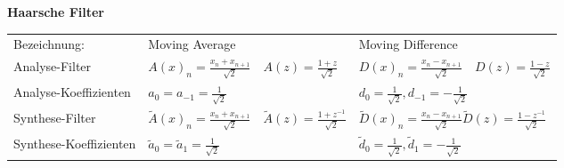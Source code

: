 \textbf{Haarsche Filter }\\
  \begin{tabularx}{\textwidth}{l |l |X}
    Bezeichnung:
      & Moving Average
      & Moving Difference \\
    Analyse-Filter
      & $A(x)_n = \frac{x_n + x_{n+1}}{\sqrt{2}} \quad
         A(z) = \frac{1+z}{\sqrt{2}}$
      & $D(x)_n = \frac{x_n - x_{n+1}}{\sqrt{2}} \quad
         D(z) = \frac{1-z}{\sqrt{2}}$ \\
    Analyse-Koeffizienten
      & $a_0 = a_{-1} = \frac{1}{\sqrt{2}}$
      & $d_0 = \frac{1}{\sqrt{2}}, d_{-1} = -\frac{1}{\sqrt{2}}$ \\
    Synthese-Filter
      & $\tilde{A}(x)_n = \frac{x_n + x_{n+1}}{\sqrt{2}} \quad
         \tilde{A}(z) = \frac{1+z^{-1}}{\sqrt{2}}$
      & $\tilde{D}(x)_n = \frac{x_n - x_{n+1}}{\sqrt{2}}
         \tilde{D}(z) = \frac{1-z^{-1}}{\sqrt{2}}$ \\
    Synthese-Koeffizienten
      & $\tilde{a}_0 = \tilde{a}_{1} = \frac{1}{\sqrt{2}}$
      & $\tilde{d}_0 = \frac{1}{\sqrt{2}}, \tilde{d}_{1} = -\frac{1}{\sqrt{2}}$ \\
    
  \end{tabularx}